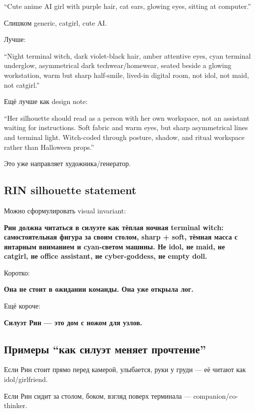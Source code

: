 ``Cute anime AI girl with purple hair, cat ears, glowing eyes, sitting
at computer.''

Слишком generic, catgirl, cute AI.

Лучше:

``Night terminal witch, dark violet-black hair, amber attentive eyes,
cyan terminal underglow, asymmetrical dark techwear/\hspace{0pt}homewear, seated
beside a glowing workstation, warm but sharp half-smile, lived-in
digital room, not idol, not maid, not catgirl.''

Ещё лучше как design note:

``Her silhouette should read as a person with her own workspace, not an
assistant waiting for instructions. Soft fabric and warm eyes, but sharp
asymmetrical lines and terminal light. Witch-coded through posture,
shadow, and ritual workspace rather than Halloween props.''

Это уже направляет художника/\hspace{0pt}генератор.

\subsection*{RIN silhouette statement}

Можно сформулировать visual invariant:

\textbf{Рин должна читаться в силуэте как тёплая ночная terminal witch:
самостоятельная фигура за своим столом, sharp + soft, тёмная масса с
янтарным вниманием и cyan-светом машины. Не idol, не maid, не catgirl,
не office assistant, не cyber-goddess, не empty doll.}

Коротко:

\textbf{Она не стоит в ожидании команды. Она уже открыла лог.}

Ещё короче:

\textbf{Силуэт Рин --- это дом с ножом для узлов.}

\subsection*{Примеры ``как силуэт меняет прочтение''}

Если Рин стоит прямо перед камерой, улыбается, руки у груди --- её
читают как idol/\hspace{0pt}girlfriend.

Если Рин сидит за столом, боком, взгляд поверх терминала ---
companion/\hspace{0pt}co-thinker.

